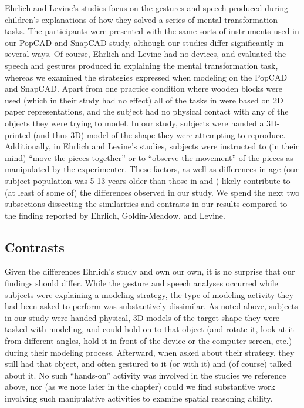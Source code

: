 Ehrlich and Levine's studies focus on the gestures and speech produced during
children's explanations of how they solved a series of mental transformation
tasks. The participants were presented with the same sorts of instruments used
in our PopCAD and SnapCAD study, although our studies differ significantly in
several ways. Of course, Ehrlich and Levine had no devices, and evaluated the
speech and gestures produced in explaining the mental transformation task,
whereas we examined the strategies expressed when modeling on the PopCAD and
SnapCAD. Apart from one practice condition where wooden blocks were used (which
in their study had no effect) all of the tasks in \cite{ehrlich2006importance}
were based on 2D paper representations, and the subject had no physical contact
with any of the objects they were trying to model. In our study, subjects were
handed a 3D-printed (and thus 3D) model of the shape they were attempting to
reproduce. Additionally, in Ehrlich and Levine's studies, subjects were
instructed to (in their mind) ``move the pieces together'' or to ``observe the
movement'' of the pieces as manipulated by the experimenter. These factors, as
well as differences in age (our subject population was 5-13 years older than
those in \cite{levine1999early} and \cite{ehrlich2006importance}) likely
contribute to (at least of some of) the differences observed in our study. We
spend the next two subsections dissecting the similarities and contrasts in our
results compared to the finding reported by Ehrlich, Goldin-Meadow, and Levine.


\subsection{Contrasts}

Given the differences Ehrlich's study and own our own, it is no surprise that
our findings should differ. While the gesture and speech analyses
occurred while subjects were explaining a modeling strategy, the type of
modeling activity they had been asked to perform was substantively dissimilar.
As noted above, subjects in our study were handed physical, 3D models of the
target shape they were tasked with modeling, and could hold on to that object
(and rotate it, look at it from different angles, hold it in front of the device
or the computer screen, etc.) during their modeling process.
Afterward, when asked about their strategy, they still had that object, and
often gestured to it (or with it) and (of course) talked about it. No such
``hands-on'' activity was involved in the studies we reference above, nor (as we
note later in the chapter) could we find substantive work involving such
manipulative activities to examine spatial reasoning ability.

